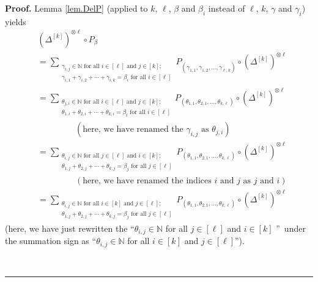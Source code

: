 \documentclass[numbers=enddot,12pt,final,onecolumn,notitlepage]{scrartcl}%
\theoremstyle{definition}
\newenvironment{proof}[1][Proof]{\noindent\textbf{#1.} }{\ \rule{0.5em}{0.5em}}
\let\sumnonlimits\sum
\renewcommand{\sum}{\sumnonlimits\limits}
\begin{document}
\begin{proof}
Lemma \ref{lem.DelP} (applied to $k$, $\ell$, $\beta$ and $\beta_{i}$ instead
of $\ell$, $k$, $\gamma$ and $\gamma_{i}$) yields%
\begin{align}
&  \left(  \Delta^{\left[  k\right]  }\right)  ^{\otimes\ell}\circ P_{\beta
}\nonumber\\
&  =\sum_{\substack{\gamma_{i,j}\in\mathbb{N}\text{ for all }i\in\left[
\ell\right]  \text{ and }j\in\left[  k\right]  ;\\\gamma_{i,1}+\gamma
_{i,2}+\cdots+\gamma_{i,k}=\beta_{i}\text{ for all }i\in\left[  \ell\right]
}}P_{\left(  \gamma_{1,1},\gamma_{1,2},\ldots,\gamma_{\ell,k}\right)  }%
\circ\left(  \Delta^{\left[  k\right]  }\right)  ^{\otimes\ell}\nonumber\\
&  =\sum_{\substack{\theta_{j,i}\in\mathbb{N}\text{ for all }i\in\left[
\ell\right]  \text{ and }j\in\left[  k\right]  ;\\\theta_{1,i}+\theta
_{2,i}+\cdots+\theta_{k,i}=\beta_{i}\text{ for all }i\in\left[  \ell\right]
}}P_{\left(  \theta_{1,1},\theta_{2,1},\ldots,\theta_{k,\ell}\right)  }%
\circ\left(  \Delta^{\left[  k\right]  }\right)  ^{\otimes\ell}\nonumber\\
&  \ \ \ \ \ \ \ \ \ \ \ \ \ \ \ \ \ \ \ \ \left(  \text{here, we have renamed
the }\gamma_{i,j}\text{ as }\theta_{j,i}\right) \nonumber\\
&  =\sum_{\substack{\theta_{i,j}\in\mathbb{N}\text{ for all }j\in\left[
\ell\right]  \text{ and }i\in\left[  k\right]  ;\\\theta_{1,j}+\theta
_{2,j}+\cdots+\theta_{k,j}=\beta_{j}\text{ for all }j\in\left[  \ell\right]
}}P_{\left(  \theta_{1,1},\theta_{2,1},\ldots,\theta_{k,\ell}\right)  }%
\circ\left(  \Delta^{\left[  k\right]  }\right)  ^{\otimes\ell}\nonumber\\
&  \ \ \ \ \ \ \ \ \ \ \ \ \ \ \ \ \ \ \ \ \left(  \text{here, we have renamed
the indices }i\text{ and }j\text{ as }j\text{ and }i\right) \nonumber\\
&  =\sum_{\substack{\theta_{i,j}\in\mathbb{N}\text{ for all }i\in\left[
k\right]  \text{ and }j\in\left[  \ell\right]  ;\\\theta_{1,j}+\theta
_{2,j}+\cdots+\theta_{k,j}=\beta_{j}\text{ for all }j\in\left[  \ell\right]
}}P_{\left(  \theta_{1,1},\theta_{2,1},\ldots,\theta_{k,\ell}\right)  }%
\circ\left(  \Delta^{\left[  k\right]  }\right)  ^{\otimes\ell}
\label{pf.thm.sol-mac-1.dP2}%
\end{align}
(here, we have just rewritten the \textquotedblleft$\theta_{i,j}\in\mathbb{N}$
for all $j\in\left[  \ell\right]  $ and $i\in\left[  k\right]  $%
\textquotedblright\ under the summation sign as \textquotedblleft$\theta
_{i,j}\in\mathbb{N}$ for all $i\in\left[  k\right]  $ and $j\in\left[
\ell\right]  $\textquotedblright).


\end{proof}
\end{document}
